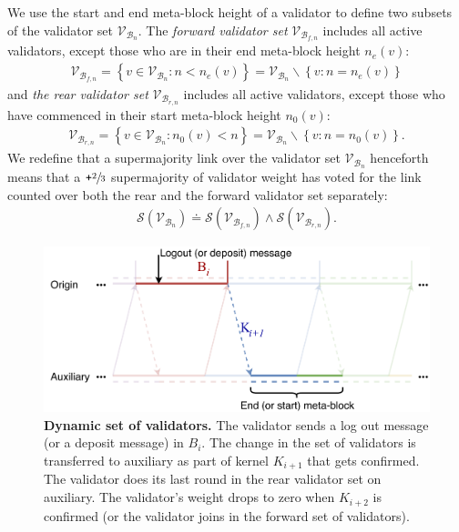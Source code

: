 \documentclass[12pt,a4paper]{article}
\begin{document}
We use the start and end meta-block height of a validator to define two subsets of the validator set $\mathcal{V}_{\mathcal{B}_n}$.
The \emph{forward validator set} $\mathcal{V}_{\mathcal{B}_{f,n}}$ includes all active validators, except those who are in their end meta-block height $n_e(v)$:
\begin{align}
  \mathcal{V}_{\mathcal{B}_{f,n}} = \left\{v \in \mathcal{V}_{\mathcal{B}_{n}}: n < n_e(v) \right\} = \mathcal{V}_{\mathcal{B}_{n}} \backslash \left\{v : n = n_e(v) \right\}
\end{align}
and \emph{the rear validator set} $\mathcal{V}_{\mathcal{B}_{r,n}}$ includes all active validators, except those who have commenced in their start meta-block height $n_0(v)$:
\begin{align}
  \mathcal{V}_{\mathcal{B}_{r,n}} = \left\{v \in \mathcal{V}_{\mathcal{B}_{n}}: n_0(v) < n \right\} = \mathcal{V}_{\mathcal{B}_{n}} \backslash \left\{v : n = n_0(v) \right\}.
\end{align}
We redefine that a supermajority link over the validator set $\mathcal{V}_{\mathcal{B}_n}$ henceforth means that a $\texttt{+}\sfrac{2}{3}$ supermajority of validator weight has voted for the link counted over both the rear and the forward validator set separately:
\begin{align}
  \mathcal{S}(\mathcal{V}_{\mathcal{B}_n}) \doteq \mathcal{S}(\mathcal{V}_{\mathcal{B}_{f,n}}) \land \mathcal{S}(\mathcal{V}_{\mathcal{B}_{r,n}}).
\end{align}

\begin{figure}[htb]
    \centering
	\includegraphics[width=\textwidth]{dynamic_validators}
	\caption{\textbf{Dynamic set of validators.}
		The validator sends a log out message (or a deposit message) in $B_i$.
		The change in the set of validators is transferred to auxiliary as part of kernel $K_{i+1}$ that gets confirmed.
		The validator does its last round in the rear validator set on auxiliary.
		The validator's weight drops to zero when $K_{i+2}$ is confirmed (or the validator joins in the forward set of validators).
	}
	\label{fig:dynamic_validators}
\end{figure}
\end{document}
